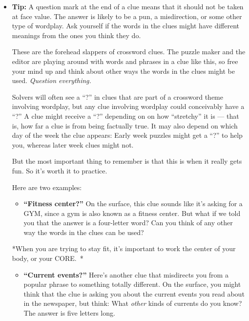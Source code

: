 \begin{itemize}
\item
  \textbf{Tip:} A question mark at the end of a clue means that it
  should not be taken at face value. The answer is likely to be a pun, a
  misdirection, or some other type of wordplay. Ask yourself if the
  words in the clues might have different meanings from the ones you
  think they do.

  These are the forehead slappers of crossword clues. The puzzle maker
  and the editor are playing around with words and phrases in a clue
  like this, so free your mind up and think about other ways the words
  in the clues might be used. \emph{Question everything.}

  Solvers will often see a ``?'' in clues that are part of a crossword
  theme involving wordplay, but any clue involving wordplay could
  conceivably have a ``?'' A clue might receive a ``?'' depending on on
  how ``stretchy'' it is --- that is, how far a clue is from being
  factually true. It may also depend on which day of the week the clue
  appears: Early week puzzles might get a ``?'' to help you, whereas
  later week clues might not.

  But the most important thing to remember is that this is when it
  really gets fun. So it's worth it to practice.

  Here are two examples:

  \begin{itemize}
  \tightlist
  \item
    \textbf{``Fitness center?''} On the surface, this clue sounds like
    it's asking for a GYM, since a gym is also known as a fitness
    center. But what if we told you that the answer is a four-letter
    word? Can you think of any other way the words in the clues can be
    used?
  \end{itemize}

  *When you are trying to stay fit, it's important to work the center of
  your body, or your CORE.~*

  \begin{itemize}
  \tightlist
  \item
    \textbf{``Current events?''} Here's another clue that misdirects you
    from a popular phrase to something totally different. On the
    surface, you might think that the clue is asking you about the
    current events you read about in the newspaper, but think: What
    \emph{other} kinds of currents do you know? The answer is five
    letters long.~
  \end{itemize}


\end{itemize}

